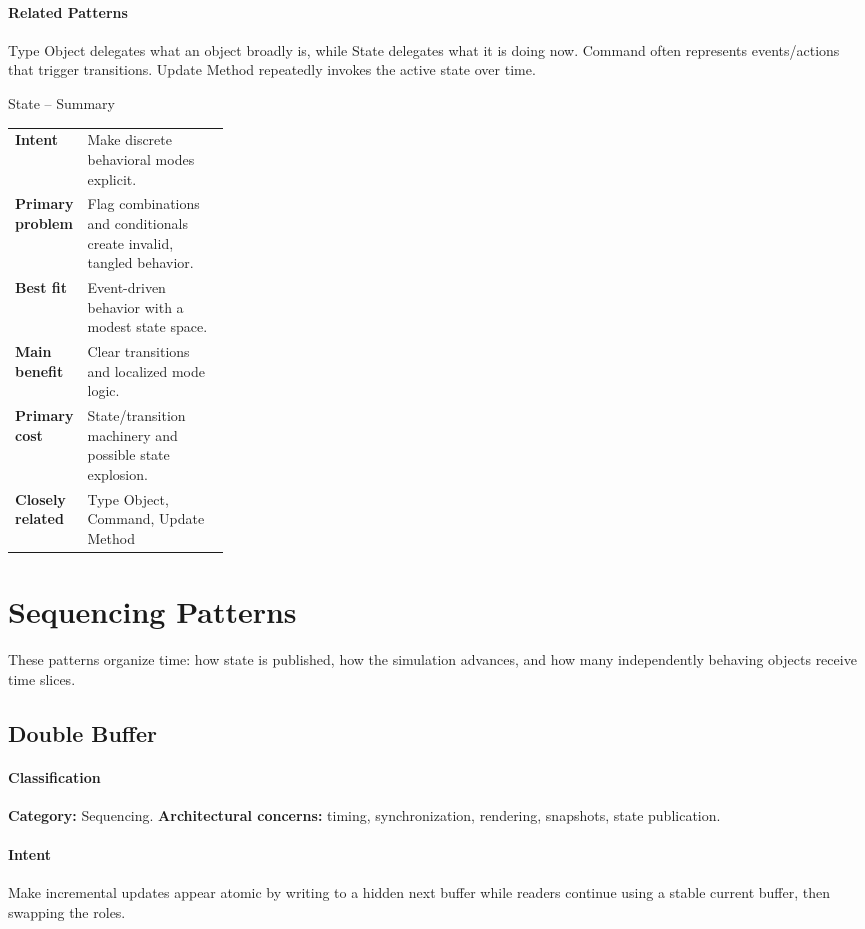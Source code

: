 \documentclass[11pt]{article}
\begin{document}
\paragraph{Related Patterns} Type Object delegates what an object broadly is, while State delegates what it is doing now. Command often represents events/actions that trigger transitions. Update Method repeatedly invokes the active state over time.

\begin{patternsummary}{State -- Summary}
\begin{tabularx}{\linewidth}{@{}>{\bfseries}p{0.25\linewidth}X@{}}
Intent & Make discrete behavioral modes explicit. \\
Primary problem & Flag combinations and conditionals create invalid, tangled behavior. \\
Best fit & Event-driven behavior with a modest state space. \\
Main benefit & Clear transitions and localized mode logic. \\
Primary cost & State/transition machinery and possible state explosion. \\
Closely related & Type Object, Command, Update Method \\
\end{tabularx}
\end{patternsummary}

\section{Sequencing Patterns}\label{sec:sequencing}
These patterns organize time: how state is published, how the simulation advances, and how many independently behaving objects receive time slices.

\subsection{Double Buffer}\label{pat:double-buffer}
\paragraph{Classification} \textbf{Category:} Sequencing. \textbf{Architectural concerns:} timing, synchronization, rendering, snapshots, state publication.
\paragraph{Intent} Make incremental updates appear atomic by writing to a hidden next buffer while readers continue using a stable current buffer, then swapping the roles.
\end{document}
